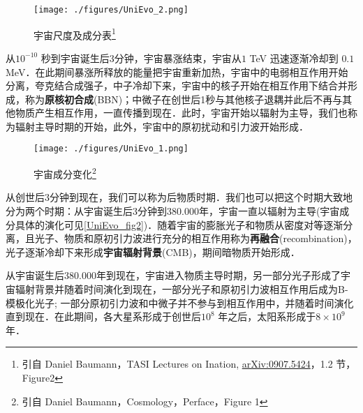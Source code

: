 \begin{figure}[ht]
\centering
\texttt{[image: ./figures/UniEvo\_2.png]}
\caption{宇宙尺度及成分表\footnote{引自 Daniel Baumann，TASI Lectures on Ination, \href{https://arxiv.org/abs/0907.5424}{arXiv:0907.5424}，1.2 节，Figure2}} \label{UniEvo_fig1}
\end{figure}

从$10^{-10}$ 秒到宇宙诞生后3分钟，宇宙暴涨结束，宇宙从$1$ TeV 迅速逐渐冷却到 $0.1 $ MeV．在此期间暴涨所释放的能量把宇宙重新加热，宇宙中的电弱相互作用开始分离，夸克结合成强子，中子冷却下来，宇宙中的核子开始在相互作用下结合并形成，称为\textbf{原核初合成}(BBN)；中微子在创世后1秒与其他核子退耦并此后不再与其他物质产生相互作用，一直传播到现在．此时，宇宙开始以辐射为主导，我们也称为辐射主导时期的开始，此外，宇宙中的原初扰动和引力波开始形成．

\begin{figure}[ht]
\centering
\texttt{[image: ./figures/UniEvo\_1.png]}
\caption{宇宙成分变化\footnote{引自 Daniel Baumann，Cosmology，Perface，Figure 1}} \label{UniEvo_fig2}
\end{figure}

从创世后3分钟到现在，我们可以称为后物质时期．我们也可以把这个时期大致地分为两个时期：从宇宙诞生后3分钟到380.000年，宇宙一直以辐射为主导(宇宙成分具体的演化可见\autoref{UniEvo_fig2})．随着宇宙的膨胀光子和物质从密度对等逐渐分离，且光子、物质和原初引力波进行充分的相互作用称为\textbf{再融合}(recombination)，光子逐渐冷却下来形成\textbf{宇宙辐射背景}(CMB)，期间暗物质开始形成．

从宇宙诞生后380.000年到现在，宇宙进入物质主导时期，另一部分光子形成了宇宙辐射背景并随着时间演化到现在，一部分光子和原初引力波相互作用后成为B-模极化光子; 一部分原初引力波和中微子并不参与到相互作用中，并随着时间演化直到现在．在此期间，各大星系形成于创世后$10^8$ 年之后，太阳系形成于$8\times 10^9$年．




